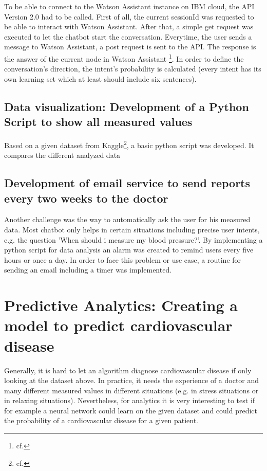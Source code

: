 To be able to connect to the Watson Assistant instance on IBM cloud, the \ac{API} Version 2.0 had to be called. First of all, the current sessionId was requested to be able to interact with Watson Assistant. After that, a simple get request was executed to let the chatbot start the conversation. Everytime, the user sends a message to Watson Assistant, a post request is sent to the \ac{API}. The response is the answer of the current node in Watson Assistant \footnote{cf.\autocite{wa_api_v2}}. In order to define the conversation's direction, the intent's probability is calculated (every intent has its own learning set which at least should include six sentences).

\subsection{Data visualization: Development of a Python Script to show all measured values} 

Based on a given dataset from Kaggle\footnote{cf.\autocite{kaggle}}, a basic python script was developed. It compares the different analyzed data


\subsection{Development of email service to send reports every two weeks to the doctor}

Another challenge was the way to automatically ask the user for his measured data. Most chatbot only helps in certain situations including precise user intents, e.g. the question 'When should i measure my blood pressure?'. By implementing a python script for data analysis an alarm was created to remind users every five hours or once a day.
In order to face this problem or use case, a routine for sending an email including a timer was implemented.

\section{Predictive Analytics: Creating a model to predict cardiovascular disease} \label{predict}
Generally, it is hard to let an algorithm diagnose cardiovascular disease if only looking at the dataset above. In practice, it needs the experience of a doctor and many different measured values in different situations (e.g. in stress situations or in relaxing situations). Nevertheless, for analytics it is very interesting to test if for example a neural network could learn on the given dataset and could predict the probability of a cardiovascular disease for a given patient. 

